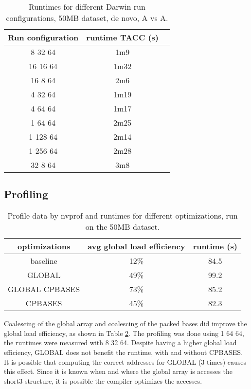 \documentclass[../thesis.tex]{subfiles}
\begin{document}
\begin{table}
\centering
\caption{Runtimes for different Darwin run configurations, 50MB dataset, de novo, A vs A.}
\label{tbl:darwin6}
\begin{tabular}{c|cc}
Run configuration & runtime TACC (s) \\ \hline
 8 32 64 & 1m9 \\
16 16 64 & 1m32 \\
16  8 64 & 2m6 \\
 4 32 64 & 1m19 \\
 4 64 64 & 1m17 \\
 1 64 64 & 2m25 \\
1 128 64 & 2m14 \\
1 256 64 & 2m28 \\
 32 8 64 & 3m8 \\
\end{tabular}
\end{table}





\newpage



\subsection{Profiling}

\begin{table}
\centering
\caption{Profile data by nvprof and runtimes for different optimizations, run on the 50MB dataset.}
\label{tbl:darwin_prof}
\begin{tabular}{c c c}
optimizations & avg global load efficiency & runtime (s) \\ \hline
baseline & 12\% & 84.5 \\
GLOBAL & 49\% & 99.2 \\
GLOBAL CPBASES & 73\% & 85.2 \\
CPBASES & 45\% & 82.3 \\
\end{tabular}
\end{table}

Coalescing of the global array and coalescing of the packed bases did improve the global load efficiency, as shown in Table \ref{tbl:darwin_prof}.
The profiling was done using 1 64 64, the runtimes were measured with 8 32 64.
Despite having a higher global load efficiency, GLOBAL does not benefit the runtime, with and without CPBASES.
It is possible that computing the correct addresses for GLOBAL (3 times) causes this effect.
Since it is known when and where the global array is accesses the short3 structure, it is possible the compiler optimizes the accesses.
\end{document}
